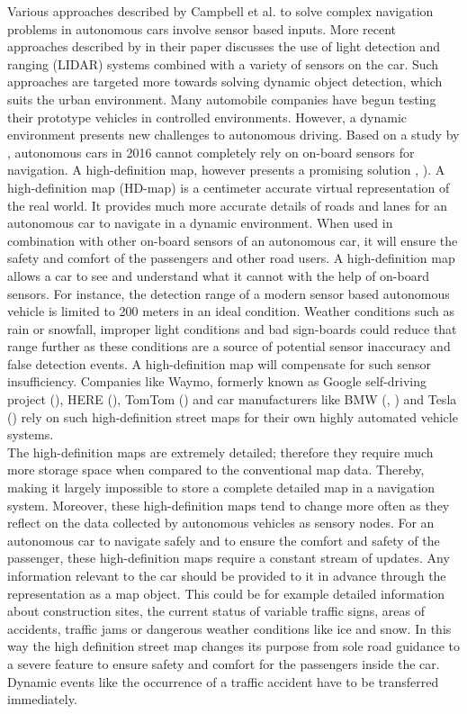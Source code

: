 Various approaches described by Campbell et al. to solve complex navigation problems in autonomous cars involve sensor based inputs. More recent approaches described by \citet{levinson2011towards} in their paper discusses the use of light detection and ranging (LIDAR) systems combined with a variety of sensors on the car. Such approaches are targeted more towards solving dynamic object detection, which suits the urban environment. Many automobile companies have begun testing their prototype vehicles in controlled environments. However, a dynamic environment presents new challenges to autonomous driving. Based on a study by \citet{aeberhard2015experience}, autonomous cars in 2016 cannot completely rely on on-board sensors for navigation. A high-definition map, however presents a promising solution \cite{360hdmaps}, \cite{hdmapauto}). A high-definition map (HD-map) is a centimeter accurate virtual representation of the real world. It provides much more accurate details of roads and lanes for an autonomous car to navigate in a dynamic environment. When used in combination with other on-board sensors of an autonomous car, it will ensure the safety and comfort of the passengers and other road users. A high-definition map allows a car to see and understand what it cannot with the help of on-board sensors. For instance, the detection range of a modern sensor based autonomous vehicle is limited to 200 meters in an ideal condition. Weather conditions such as rain or snowfall, improper light conditions and bad sign-boards could reduce that range further as these conditions are a source of potential sensor inaccuracy and false detection events. A high-definition map will compensate for such sensor insufficiency. Companies like Waymo, formerly known as Google self-driving project (\citet{madrigal}), HERE (\citet{stevenson}), TomTom (\cite{tomtom}) and car manufacturers like BMW (\citet{bender2014lanelets}, \citet{aeberhard2015experience}) and Tesla (\citet{perkins}) rely on such high-definition street maps for their own highly automated vehicle systems. \\


The high-definition maps are extremely detailed; therefore they require much more storage space when compared to the conventional map data. Thereby, making it largely impossible to store a complete detailed map in a navigation system. Moreover, these high-definition maps tend to change more often as they reflect on the data collected by autonomous vehicles as sensory nodes. For an autonomous car to navigate safely and to ensure the comfort and safety of the passenger, these high-definition maps require a constant stream of updates. Any information relevant to the car should be provided to it in advance through the representation as a map object. This could be for example detailed information about construction sites, the current status of variable traffic signs, areas of accidents, traffic jams or dangerous weather conditions like ice and snow. In this way the high definition street map changes its purpose from sole road guidance to a severe feature to ensure safety and comfort for the passengers inside the car. Dynamic events like the occurrence of a traffic accident have to be transferred immediately. \\ 
 
